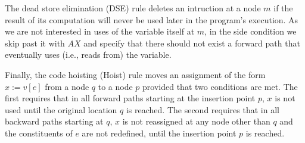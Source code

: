 The dead store elimination (DSE) rule deletes an intruction at a node $m$ if the result of its computation will never be used later in the program's execution. As we are not interested in uses of the variable itself at $m$, in the side condition we skip past it with $AX$ and specify that there should not exist a forward path that eventually uses (i.e., reads from) the variable. 

Finally, the code hoisting (Hoist) rule moves an assignment of the form $x:=v[e]$ from a node $q$ to a node $p$ provided that two conditions are met. The first requires that in all forward paths starting at the insertion point $p$, $x$ is not used until the original location $q$ is reached. The second requires that in all backward paths starting at $q$, $x$ is not reassigned at any node other than $q$ and the constituents of $e$ are not redefined, until the insertion point $p$ is reached. %